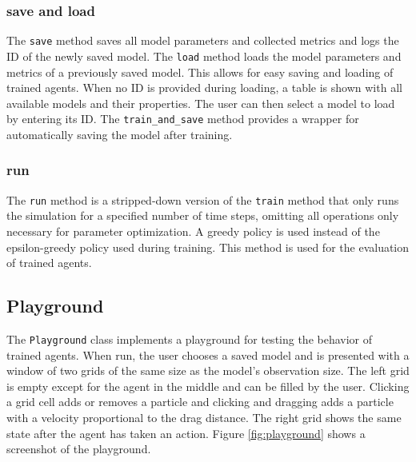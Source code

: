 \subsubsection{save and load}
The \texttt{save} method saves all model parameters and collected metrics and logs the ID of the newly saved model. The \texttt{load} method loads the model parameters and metrics of a previously saved model. This allows for easy saving and loading of trained agents. When no ID is provided during loading, a table is shown with all available models and their properties. The user can then select a model to load by entering its ID. The \texttt{train\_and\_save} method provides a wrapper for automatically saving the model after training.

\subsubsection{run}
The \texttt{run} method is a stripped-down version of the \texttt{train} method that only runs the simulation for a specified number of time steps, omitting all operations only necessary for parameter optimization. A greedy policy is used instead of the epsilon-greedy policy used during training. This method is used for the evaluation of trained agents. 


\subsection{Playground}
\label{subsec:implementation-playground}
The \texttt{Playground} class implements a playground for testing the behavior of trained agents. When run, the user chooses a saved model and is presented with a window of two grids of the same size as the model's observation size. The left grid is empty except for the agent in the middle and can be filled by the user. Clicking a grid cell adds or removes a particle and clicking and dragging adds a particle with a velocity proportional to the drag distance. The right grid shows the same state after the agent has taken an action. Figure \ref{fig:playground} shows a screenshot of the playground.

